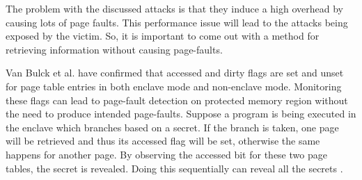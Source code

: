 \begin{figure}[htp]
	\centering
	\quad
	\caption{}
\end{figure}

The problem with the discussed attacks is that they induce a high overhead by causing lots of page faults. This performance issue will lead to the attacks being exposed by the victim. So, it is important to come out with a method for retrieving information without causing page-faults.

Van Bulck et al. \cite{stealthy} have confirmed that accessed and dirty flags are set and unset for page table entries in both enclave mode and non-enclave mode. Monitoring these flags can lead to page-fault detection on protected memory region without the need to produce intended page-faults. Suppose a program is being executed in the enclave which branches based on a secret. If the branch is taken, one page will be retrieved and thus its accessed flag will be set, otherwise the same happens for another page. By observing the accessed bit for these two page tables, the secret is revealed. Doing this sequentially can reveal all the secrets \cite{stealthy}.

